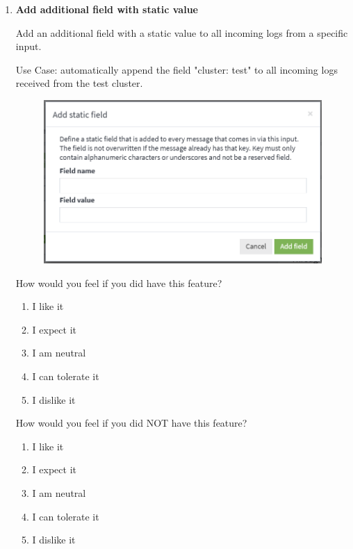 \documentclass[../main.tex]{subfiles}
\begin{document}
\begin{enumerate}
    \clearpage
    \item \textbf{Add additional field with static value}

    Add an additional field with a static value to all incoming logs from a specific input. 
    
    Use Case: automatically append the field "cluster: test" to all incoming logs received from the test cluster.

    \begin{figure}[H]
        \centering
        \includegraphics[scale=0.6]{img/10-appendix/static_field.png}
        \label{fig:static_field}
    \end{figure}

    How would you feel if you did have this feature?
    
    \begin{enumerate}
        \item I like it
        \item I expect it
        \item  I am neutral
        \item I can tolerate it
        \item I dislike it
    \end{enumerate}

    How would you feel if you did NOT have this feature?
    
    \begin{enumerate}
        \item I like it
        \item I expect it
        \item  I am neutral
        \item I can tolerate it
        \item I dislike it
    \end{enumerate}


\end{enumerate}
\end{document}
